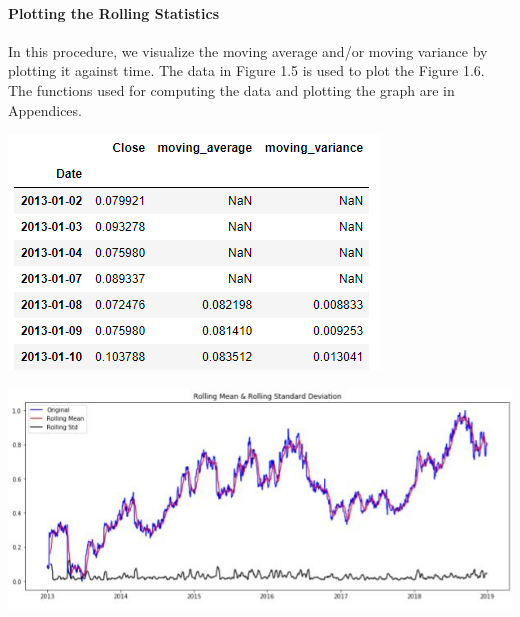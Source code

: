 		\paragraph{Plotting the Rolling Statistics}

			In this procedure, we visualize the moving average and/or moving variance by plotting it against time. The data in Figure 1.5 is used to plot the Figure 1.6. The functions used for computing the data and plotting the graph are in Appendices. 
		\begin{center}
		\includegraphics[width=\linewidth]{figures/Moving-Average-and-Moving-Variance.jpg}	
		\label{fig: Moving Average and Moving Variance of the Closing Price with window size = 5}
		\end{center}

		\begin{center}
		\includegraphics[width=\linewidth]{figures/Plot-of-the-Rolling-Mean-and-the-Rolling-Standard-Deviation.jpg}	
		\label{fig: Plot of the Rolling Mean and the Rolling Standard Deviation of Moving Average of Closing Price}
		\end{center}
	
